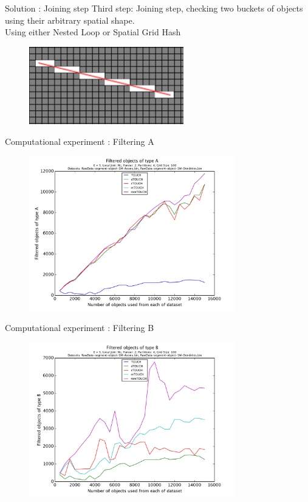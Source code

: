 \documentclass{beamer}
\begin{document}
\begin{frame}{Solution : Joining step}
Third step: Joining step, checking two buckets of objects using their arbitrary spatial shape. \\
Using either Nested Loop or Spatial Grid Hash
\begin{figure}[p]
    \centering
    \includegraphics[width=0.6\textwidth]{Images/line.png}
\end{figure}
\end{frame}
\begin{frame}{Computational experiment : Filtering A}
\begin{figure}[p]
    \centering
    \includegraphics[width=0.8\textwidth]{Images/pic16.png}
\end{figure}
\end{frame}
\begin{frame}{Computational experiment : Filtering B}
\begin{figure}[p]
    \centering
    \includegraphics[width=0.8\textwidth]{Images/pic17.png}
\end{figure}
\end{frame}
\end{document}
